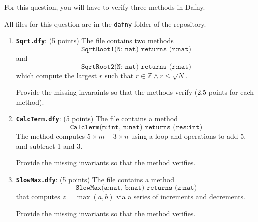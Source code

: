 For this question, you will have to verify three methods
in Dafny.

All files for this question are in the \texttt{dafny} folder of
the repository.

\begin{enumerate}[label=(\alph*)]
\item \textbf{\texttt{Sqrt.dfy}}: (5 points) The file contains two methods
  \[\texttt{SqrtRoot1(N: nat) returns (r:nat)}\] and \[\texttt{SqrtRoot2(N: nat) returns (r:nat)}\]
  which compute the largest $r$ such that $r \in \mathbb{Z} \wedge r \le \sqrt{N}$.

  Provide the missing invaraints so that the methods verify (2.5 points for each method).
\item \textbf{\texttt{CalcTerm.dfy}}: (5 points) The file contains a method
  \[\texttt{CalcTerm(m:int, n:nat) returns (res:int)}\]
  The method computes $5\times m - 3\times n$ using a loop and
  operations to add 5, and subtract 1 and 3.

  Provide the missing invariants so that the
  method verifies.
\item \textbf{\texttt{SlowMax.dfy}}: (5 points) The file contains a
  method \[\texttt{SlowMax(a:nat, b:nat) returns (z:nat)}\] that computes $z =
  \max(a, b)$ via a series of increments and decrements.

  Provide the missing invariants so that the
  method verifies.

\end{enumerate}

